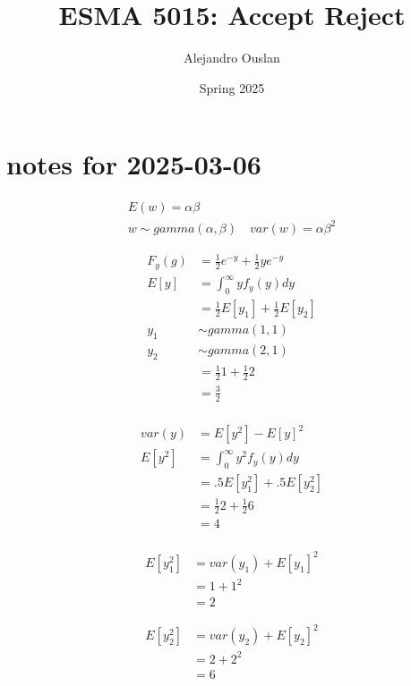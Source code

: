 \documentclass[10pt, oneside]{article}
\title{ESMA 5015: Accept Reject}
\author{Alejandro Ouslan}
\date{Spring 2025}
\begin{document}
\maketitle
\tableofcontents

\vspace{.25in}

\section{notes for 2025-03-06}

\[
	\begin{split}
		E(w) = \alpha \beta \\
		w\sim gamma(\alpha, \beta) \quad var(w) = \alpha \beta^2
	\end{split}
\]


\[
	\begin{split}
		F_y (g) & = \frac{1}{2} e^{-y} + \frac{1}{2} y e^{-y} \\
		E[y]    & = \int_0^\infty y f_y(y) dy                 \\
		& = \frac{1}{2} E[y_1] + \frac{1}{2} E[y_2]   \\
		y_1     & \sim gamma(1,1)                             \\
		y_2     & \sim gamma(2,1)                             \\
		& = \frac{1}{2} 1 + \frac{1}{2} 2             \\
		& = \frac{3}{2}                               \\
	\end{split}
\]


\[
	\begin{split}
		var (y) & = E[y^2] - E[y]^2               \\
		E[y^2]  & = \int_0^\infty y^2 f_y(y) dy   \\
		& = .5 E[y_1^2] + .5 E[y_2^2]     \\
		& = \frac{1}{2} 2 + \frac{1}{2} 6 \\
		& = 4                             \\
	\end{split}
\]

\[
	\begin{split}
		E[y_1^2] & = var(y_1) + E[y_1]^2 \\
		& = 1 + 1^2             \\
		& = 2
	\end{split}
\]

\[
	\begin{split}
		E[y_2^2] & = var(y_2) + E[y_2]^2 \\
		& = 2 + 2^2             \\
		& = 6
	\end{split}
\]
\end{document}
